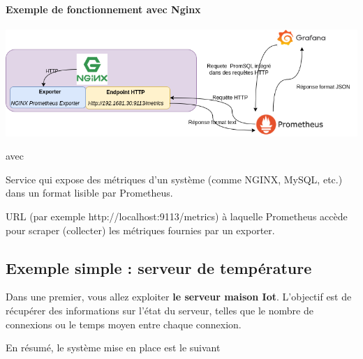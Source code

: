 \documentclass[french, 12pt]{article}%
\newcommand{\titreencadre}{Titre}
\newenvironment{encadre}[1]{\renewcommand{\titreencadre}{#1}
	\begin{mdframed}[style=encadrestyle]
	\vspace{0.5\baselineskip}
	}{%
	\end{mdframed}}
\begin{document}
\paragraph{Exemple de fonctionnement avec Nginx }

\begin{center}
\includegraphics[scale=0.5]{./ressource/schemaPrometheus.drawio.png}
\end{center}
avec 

\begin{encadre}{Exporter}
Service qui expose des métriques d’un système (comme NGINX, MySQL, etc.) dans un format lisible par Prometheus.
\end{encadre}

\begin{encadre}{Endpoint}
URL (par exemple http://localhost:9113/metrics) à laquelle Prometheus accède pour scraper (collecter) les métriques fournies par un exporter.
\end{encadre}


\subsection{Exemple simple : serveur de température}

Dans une premier, vous allez exploiter \textbf{le serveur maison Iot}. L'objectif est de récupérer des informations sur l'état du serveur, telles que le nombre de connexions ou le temps moyen entre chaque connexion.

En résumé, le système mise en place est le suivant
\end{document}
